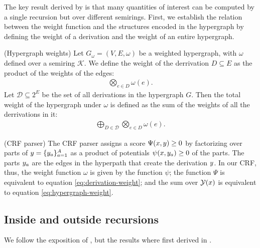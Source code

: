   The key result derived by \citet{goodman1999semiring} is that many quantities of interest can be computed by a single recursion but over different semirings. First, we establish the relation between the weight function and the structures encoded in the hypergraph by defining the weight of a derivation and the weight of an entire hypergraph.

  \begin{definition}{(Hypergraph weights)} Let $G_{\omega} = (V, E, \omega)$ be a weighted hypergraph, with $\omega$ defined over a semiring $\mathcal{K}$. We define the weight of the derrivation $D \subseteq E$ as the product of the weights of the edges:
  \begin{align}
    \label{eq:derivation-weight}
    \bigotimes_{e \in D} \omega(e).
  \end{align}
  Let $\mathcal{D} \subseteq 2^E$ be the set of all derivations in the hypergraph $G$. Then the total weight of the hypergraph under $\omega$ is defined as the sum of the weights of all the derrivations in it:
  \begin{align}
    \label{eq:hypergraph-weight}
    \bigoplus_{D \in \mathcal{D}} \bigotimes_{e \in D} \omega(e).
  \end{align}
  \end{definition}

  \begin{example}{(CRF parser)}
    The CRF parser assigns a score $\Psi(x, y) \geq 0$ by factorizing over parts of $y = \{ y_a \}_{a=1}^{A}$ as a product of potentials $\psi(x, y_a) \geq 0$ of the parts. The parts $y_a$ are the edges in the hyperpath that create the derivation $y$. In our CRF, thus, the weight function $\omega$ is given by the function $\psi$; the function $\Psi$ is equivalent to equation \ref{eq:derivation-weight}; and the sum over $\mathcal{Y}(x)$ is equivalent to equation \ref{eq:hypergraph-weight}.
  \end{example}

  \subsection{Inside and outside recursions}
  We follow the exposition of \citet{eisner2009semirings}, but the results where first derived in \citet{goodman1999semiring}.

